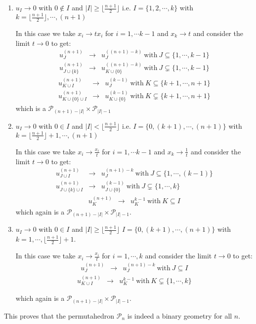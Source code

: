 \documentclass[hidelinks,12pt]{article}
\newcommand{\bea}[1]{\begin{eqnarray}\label{#1} }
\newcommand{\eea}{\end{eqnarray}}
\def\bea{\begin{eqnarray}}
\def\eea{\end{eqnarray}}
\begin{document}
\begin{enumerate}
\begin{enumerate}
\begin{enumerate}
    
    \item $u_I \rightarrow 0$ with $0\notin I$ and $|I| \ge \lfloor \frac{n+1}{2} \rfloor$ i.e. $I = \{1,2,\cdots,k \}$ with $k= \lfloor \frac{n+1}{2} \rfloor,\cdots,(n+1)$
    
     In this case we take $x_i \rightarrow t x_i$ for $i=1,\cdots k-1$ and $x_{k} \rightarrow t$ and  consider the limit $t \rightarrow 0$ to get:
    \bea
    u^{(n+1)}_{J } &\rightarrow& u_{J}^{((n+1)-k)} ~\text{with}~ J\subseteq \{1,\cdots,k-1\}\\
     u^{(n+1)}_{J \cup \{k\}} &\rightarrow& u_{K \cup\{0\}}^{((n+1)-k)} ~\text{with}~ J\subsetneq \{1,\cdots,k-1\}
    \eea
     \bea
    u^{(n+1)}_{K \cup I } &\rightarrow& u_{J}^{(k-1)} ~\text{with}~ K\subseteq \{k +1,\cdots,n+1\}\\
     u^{(n+1)}_{K \cup \{0\}\cup I} &\rightarrow& u_{K \cup\{0\}}^{(k-1)} ~\text{with}~ K\subsetneq \{k +1,\cdots,n+1\}
    \eea
   which is a $\mathscr P_{(n+1)-|I|} \times \mathscr P_{|I|-1}$ 
    \item $u_I \rightarrow 0$ with $0\in I$ and $|I| < \lfloor \frac{n+1}{2} \rfloor$ i.e. $I = \{0,(k+1),\cdots,(n+1)\}$ with $k= \lfloor \frac{n+1}{2} \rfloor+1,\cdots,(n+1)$
    
    In this case we take $x_i \rightarrow \frac{ x_i}{t}$ for $i=1,\cdots k-1$ and $x_{k} \rightarrow \frac{1}{t}$ and  consider the limit $t \rightarrow 0$ to get:
    \bea
    u^{(n+1)}_{J \cup I } &\rightarrow& u_{J}^{(n+1)-k} ~\text{with}~ J\subseteq \{1,\cdots,(k-1)\}\\
     u^{(n+1)}_{J \cup \{k\}\cup I} &\rightarrow& u_{J \cup\{0\}}^{(k-1)} ~\text{with}~ J\subsetneq \{1 ,\cdots, k\}
    \eea
     \bea
    u^{(n+1)}_{K} &\rightarrow& u_{K}^{k-1} ~\text{with}~ K\subseteq I
    \eea
    which again is a $\mathscr P_{(n+1)-|I|} \times \mathscr P_{|I|-1}$. 
    \item $u_I \rightarrow 0$ with $0\in I$ and $|I| \ge \lfloor \frac{n+1}{2} \rfloor$ $I = \{0,(k+1),\cdots,(n+1)\}$ with $k= 1,\cdots, \lfloor \frac{n+1}{2} \rfloor+1$.
    
    In this case we take $x_i \rightarrow \frac{x_i}{t}$ for $i=1,\cdots, k$ and consider the limit $t \rightarrow 0$ to get:
    \bea
    u^{(n+1)}_{J} &\rightarrow& u_{J}^{(n+1)-k} ~\text{with}~ J\subseteq I
    \eea
     \bea
    u^{(n+1)}_{K \cup I} &\rightarrow& u_{K}^{k-1} ~\text{with}~ K\subsetneq \{1,\cdots,k\}
    \eea
    
     which again is a $\mathscr P_{(n+1)-|I|} \times \mathscr P_{|I|-1}$. 
\end{enumerate}
This proves that the permutahedron $\mathscr P_n$ is indeed a binary geometry for all $n$.


\end{enumerate}
\end{enumerate}
\end{document}
